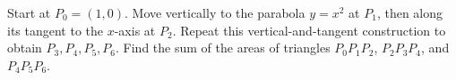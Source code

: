 Start at $P_0=(1,0)$. Move vertically to the parabola $y=x^2$ at $P_1$, then along its tangent to the $x$-axis at $P_2$. Repeat this vertical-and-tangent construction to obtain $P_3,P_4,P_5,P_6$. Find the sum of the areas of triangles $P_0P_1P_2$, $P_2P_3P_4$, and $P_4P_5P_6$.
